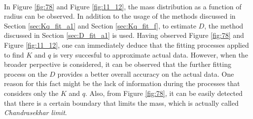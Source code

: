 \documentclass[letterpaper,12pt]{article}
\begin{document}
\paragraph{} In Figure \ref{fig:78} and Figure \ref{fig:11_12}, the mass distribution as a function of radius can be observed. In addition to the usage of the methods discussed in Section \ref{sec:Kq_fit_a1} and Section \ref{sec:Kq_fit_f}, to estimate $D$, the method discussed in Section \ref{sec:D_fit_a1} is used. Having observed Figure \ref{fig:78} and Figure \ref{fig:11_12}, one can immediately deduce that the fitting processes applied to find $K$ and $q$ is very succesful to approximate actual data. However, when the broader perpective is considered, it can be observed that the further fitting process on the $D$ provides a better overall accuracy on the actual data. One reason for this fact might be the lack of information during the processes that considers only the $K$ and $q$. Also, from Figure \ref{fig:78}, it can be easily detected that there is a certain boundary that limits the mass, which is actually called \textit{Chandrasekhar limit}.
\end{document}
